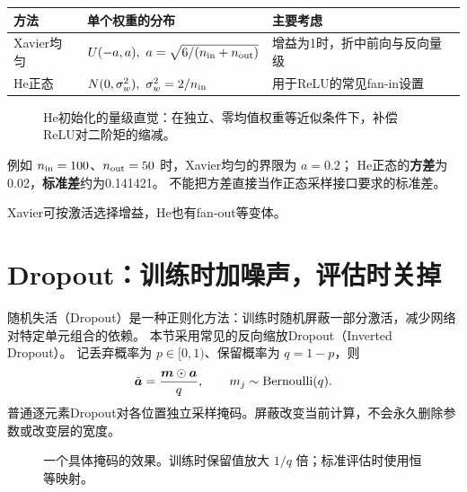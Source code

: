 \begin{center}
\small
\renewcommand{\arraystretch}{1.35}
\begin{tabularx}{\textwidth}{P{25mm}Y P{39mm}}
\toprule
方法 & 单个权重的分布 & 主要考虑\\
\midrule
Xavier均匀 & $U(-a,a),\ a=\sqrt{6/(n_{\rm in}+n_{\rm out})}$ & 增益为1时，折中前向与反向量级\\
He正态 & $N(0,\sigma_w^2),\ \sigma_w^2=2/n_{\rm in}$ & 用于ReLU的常见fan-in设置\\
\bottomrule
\end{tabularx}
\end{center}

\begin{figure}[htbp]
\centering

\caption{He初始化的量级直觉：在独立、零均值权重等近似条件下，补偿ReLU对二阶矩的缩减。}
\label{fig:train-initialization}
\par\smallskip
{}
\end{figure}

例如 $n_{\rm in}=100$、$n_{\rm out}=50$ 时，Xavier均匀的界限为 $a=0.2$；
He正态的\textbf{方差}为0.02，\textbf{标准差}约为0.141421。
不能把方差直接当作正态采样接口要求的标准差。

Xavier可按激活选择增益，He也有fan-out等变体。

\section{Dropout：训练时加噪声，评估时关掉}
\label{sec:train-dropout}

随机失活（Dropout）是一种正则化方法：训练时随机屏蔽一部分激活，减少网络对特定单元组合的依赖。
本节采用常见的反向缩放Dropout（Inverted Dropout）。
记丢弃概率为 $p\in[0,1)$、保留概率为 $q=1-p$，则
\begin{equation}
 \tilde{\boldsymbol{a}}=\frac{\boldsymbol{m}\odot\boldsymbol{a}}{q},\qquad
 m_j\sim\operatorname{Bernoulli}(q).
 \label{eq:train-dropout}
\end{equation}
普通逐元素Dropout对各位置独立采样掩码。屏蔽改变当前计算，不会永久删除参数或改变层的宽度。

\begin{figure}[htbp]
\centering

\caption{一个具体掩码的效果。训练时保留值放大 $1/q$ 倍；标准评估时使用恒等映射。}
\label{fig:train-dropout}
\par\smallskip
{}
\end{figure}

